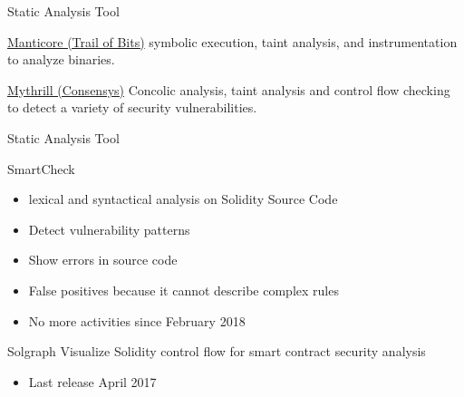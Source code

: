 \begin{frame}{Static Analysis Tool}
\begin{block}{\href{https://github.com/trailofbits/manticore.git}{Manticore (Trail of Bits)}}
symbolic execution, taint analysis, and instrumentation to analyze binaries.
\end{block}
\begin{block}{\href{https://github.com/ConsenSys/mythril}{Mythrill (Consensys)}}
Concolic analysis, taint analysis and control flow checking to detect a variety of security vulnerabilities.
\end{block}


\end{frame}

\begin{frame}{Static Analysis Tool}


\begin{block}{SmartCheck~\cite{bib:smartcheck}}
\begin{itemize}
\item lexical and syntactical analysis on Solidity Source Code
\item Detect vulnerability patterns 
\item Show errors in source code
\item False positives because it cannot describe complex rules
\item No more activities since February 2018
\end{itemize}
\end{block}


\begin{block}{Solgraph}
Visualize Solidity control flow for smart contract security analysis
\begin{itemize}
\item Last release April 2017
\end{itemize}
\end{block}
\end{frame}

